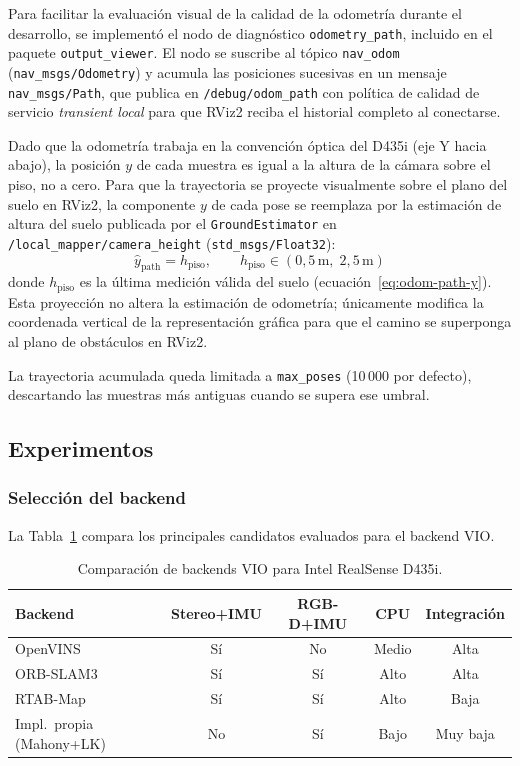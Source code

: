 Para facilitar la evaluación visual de la calidad de la odometría durante el
desarrollo, se implementó el nodo de diagnóstico \texttt{odometry\_path},
incluido en el paquete \texttt{output\_viewer}. El nodo se suscribe al tópico
\texttt{nav\_odom} (\texttt{nav\_msgs/Odometry}) y acumula las posiciones
sucesivas en un mensaje \texttt{nav\_msgs/Path}, que publica en
\texttt{/debug/odom\_path} con política de calidad de servicio
\emph{transient local} para que RViz2 reciba el historial completo al
conectarse.

Dado que la odometría trabaja en la convención óptica del D435i (eje Y hacia
abajo), la posición $y$ de cada muestra es igual a la altura de la cámara
sobre el piso, no a cero. Para que la trayectoria se proyecte visualmente
sobre el plano del suelo en RViz2, la componente $y$ de cada pose se
reemplaza por la estimación de altura del suelo publicada por el
\texttt{GroundEstimator} en \texttt{/local\_mapper/camera\_height}
(\texttt{std\_msgs/Float32}):
%
\begin{equation}
  \label{eq:odom-path-y}
  \hat{y}_{\text{path}} = h_{\text{piso}},
  \qquad
  h_{\text{piso}} \in (0{,}5\,\text{m},\; 2{,}5\,\text{m})
\end{equation}
%
donde $h_{\text{piso}}$ es la última medición válida del suelo
(ecuación~\ref{eq:odom-path-y}). Esta proyección no altera la estimación de
odometría; únicamente modifica la coordenada vertical de la representación
gráfica para que el camino se superponga al plano de obstáculos en RViz2.

La trayectoria acumulada queda limitada a \texttt{max\_poses} (10\,000 por
defecto), descartando las muestras más antiguas cuando se supera ese umbral.

\subsection{Experimentos}
\label{sec:lm-vio-experimentos}

\subsubsection{Selección del backend}

La Tabla~\ref{tab:vio-backends} compara los principales candidatos evaluados
para el backend VIO.

\begin{table}[h]
\centering
\caption{Comparación de backends VIO para Intel RealSense D435i.}
\label{tab:vio-backends}
\begin{tabular}{lcccc}
\hline
\textbf{Backend} & \textbf{Stereo+IMU} & \textbf{RGB-D+IMU} &
\textbf{CPU} & \textbf{Integración} \\
\hline
OpenVINS                   & Sí & No  & Medio & Alta \\
ORB-SLAM3 \cite{Mur2015ORB}& Sí & Sí  & Alto  & Alta \\
RTAB-Map \cite{Labbe2019RTAB}& Sí & Sí & Alto  & Baja \\
Impl.\ propia (Mahony+LK)  & No & Sí  & Bajo  & Muy baja \\
\hline
\end{tabular}
\end{table}

